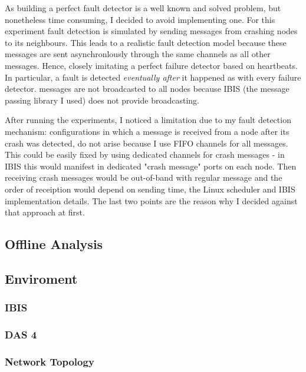 As building a perfect fault detector is a well known and solved problem, but nonetheless time consuming, I decided to avoid implementing one.
For this experiment fault detection is simulated by sending  messages from crashing nodes to its neighbours. 
This leads to a realistic fault detection model because these messages are sent asynchronlously through the same channels as all other messages. 
Hence, closely imitating a perfect failure detector based on heartbeats. 
In particular, a fault is detected \textit{eventually after} it happened as with every failure detector.
 messages are not broadcasted to all nodes because IBIS (the message passing library I used) does not provide broadcasting.

After running the experiments, I noticed a limitation due to my fault detection mechanism:
configurations in which a message is received from a node after its crash was detected, do not arise because I use FIFO channels for all messages.  %
This could be easily fixed by using dedicated channels for crash messages - in IBIS this would manifest in dedicated "crash message" ports on each node.
Then receiving crash messages would be out-of-band with regular message and the order of receiption would depend on sending time, the Linux scheduler and IBIS implementation details.
The last two points are the reason why I decided against that approach at first.

  

\subsection{Offline Analysis}

\subsection{Enviroment}
\subsubsection{IBIS}
\subsubsection{DAS 4}
\subsubsection{Network Topology}